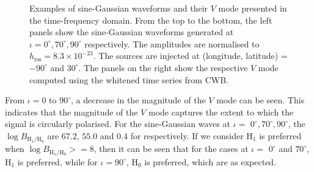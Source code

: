 \documentclass[aps,twocolumn,showpacs,groupedaddress, nofootinbib]{revtex4}  %
\begin{document}
\begin{figure}
\begin{center}
{        }\quad
    \end{center}
    \caption{Examples of sine-Gaussian waveforms and their $V$ mode presented in the time-frequency domain.
    From the top to the bottom, the left panels show the sine-Gaussian waveforms generated  at $\iota= 0^{\circ}, 70^{\circ}, 90^{\circ}$ respectively. 
    The amplitudes are normalised to  $h_\text{rss} = 8.3\times10^{-23}$.
    The sources are injected at  (longitude, latitude) = $-90^\circ$ and $30^\circ$.
    The panels on the right show the respective $V$ mode computed using the whitened time series from \ac{CWB}.
    \label{fig:simpleV}} 
\end{figure}
From $\iota = 0$ to  $90^{\circ}$, a decrease in the magnitude of the $V$ mode can be seen.
This indicates that the magnitude of the $V$ mode captures the extent to which the signal is circularly polarised.
For the sine-Gaussian waves at $\iota=$ $0^{\circ}, 70^{\circ}, 90^{\circ}$, the $\log {B_{\text{H}_1 / \text{H}_0}}$ 
are  $67.2$, $55.0$ and $0.4$ for respectively.  
If we consider $\text{H}_1$ is preferred when $\log B_{\text{H}_1 / \text{H}_0}>= 8$, 
then it can be seen that for the cases at $\iota=$ $0^{\circ}$ and  $70^{\circ}$, $\text{H}_1$ is preferred, 
while for $\iota=90^{\circ}$, $\text{H}_0$ is preferred, which are as expected.
\end{document}
